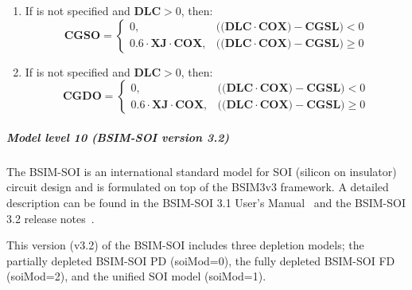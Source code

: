 \begin{enumerate}
\item If  is not specified and $\mathbf{DLC} > 0$, then:
\[
\mathbf{CGSO} = \left\{ \begin{array}{ll}
0, & ((\mathbf{DLC \cdot COX) - CGSL)} < 0        \\
0.6 \cdot \mathbf{XJ \cdot COX}, & ((\mathbf{DLC \cdot COX) - CGSL)}
\geq 0
\end{array}
\right.
\]

\item If  is not specified and $\mathbf{DLC} > 0$, then:
\[
\mathbf{CGDO} = \left\{ \begin{array}{ll}
0, & ((\mathbf{DLC \cdot COX) - CGSL)} < 0 \\
0.6 \cdot \mathbf{XJ \cdot COX},
& ((\mathbf{DLC \cdot COX) - CGSL)} \geq 0
\end{array}
\right. \]
\end{enumerate}

\subparagraph{Model level 10 (BSIM-SOI version 3.2)}

The BSIM-SOI is an international standard model for SOI (silicon on insulator)
circuit design and is formulated on top of the BSIM3v3 framework.
A detailed description can be found in the BSIM-SOI 3.1 User's
Manual~\cite{BSIMSOI:Manual} and the BSIM-SOI 3.2 release
notes~\cite{BSIMSOI:3p2:Notes}.

This version (v3.2) of the BSIM-SOI includes three depletion models;
the partially depleted BSIM-SOI PD (soiMod=0), the fully depleted BSIM-SOI
FD (soiMod=2), and the unified SOI model (soiMod=1).

